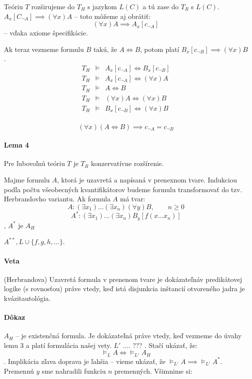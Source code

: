 \par Teóriu $T$ rozširujeme do $T_H$ s jazykom $L(C)$ a tú zase do $T_R$ s
$L(C)$. $A_x[C_{\neg A}] \implies (\forall x) A$ -- toto môžeme aj obrátiť:
$$(\forall x) A \implies A_x[c_{\neg A}]$$ -- vďaka axiome špecifikácie.
\par Ak teraz vezmeme formulu $B$ takú, že $A\iff B$, potom platí $B_x[c_{\neg
B}] \implies (\forall x) B$. 
$$
\begin{array}{lll}
T_H &\models& A_x[c_{\neg A}] \iff B_x[c_{\neg B}] \\
T_H &\models& A_x [c_{\neg A}] \iff (\forall x) A \\
T_H &\models& A \iff B \\
T_H &\models& (\forall x) A \iff (\forall x) B \\
T_H &\models& B_x[c_{\neg B}] \iff (\forall x) B \\
\end{array}
$$


$$(\forall x)(A\iff B) \implies c_{\neg A} = c_{\neg B}$$

\paragraph{Lema 4} Pre ľubovoľnú teóriu $T$ je $T_R$ konzervatívne rozšírenie.

\par Majme formulu $A$, ktorá je uzavretá a napísaná v prenexnom tvare.
Indukciou podľa počtu všeobecných kvantifikátorov budeme formulu transformovať
do tzv. Herbrandovho variantu. Ak formula $A$ má tvar:
$$ A: (\exists x_1) \ldots (\exists x_n) (\forall y) B, \qquad n \geq 0$$
$$ A^*: (\exists x_1) \ldots (\exists x_n) B_y[f(x\ldots x_n)]$$, $A^*$ je $A_H$

$A^{**}, L \cup \{ f,g,h, \ldots \}$.

\paragraph{Veta} (Herbrandova) Uzavretá formula v prenenom tvare je dokázateľnáv
predikátovej logike (s rovnosťou) práve vtedy, keď istá disjunkcia inštancií
otvoreného jadra je kvázitautológia.

\paragraph{Dôkaz} $A_H$ -- je existenčná formula. Je dokázateľná práve vtedy,
keď vezmeme do úvahy lemu 3 a platí formulácia našej vety. $L'$ .... ??? . Stačí
ukázať, že:
$$\models_L A \iff \models_{L'} A_H$$.
Implikácia zľava doprava je ľahšia -- vieme ukázať, že $\models_{L'} A \implies
\models_{L'} A^*$. Premennú $y$ sme nahradili funkciu $n$ premenných. Všimnime
si:

